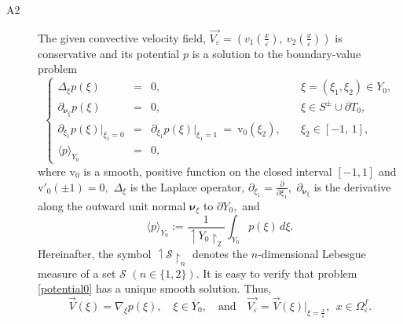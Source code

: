 \documentclass[reqno]{amsart}            %
\numberwithin{equation}{section}
\begin{document}
	
	\begin{description}
		\item[A2] The given convective velocity field, $\overrightarrow{V_\varepsilon} = \left(v_1(\frac{{x}}{\varepsilon}), \  v_2(\tfrac{{x}}{\varepsilon})
		\right)$
		is conservative  and
		its potential $p$ is a solution to the boundary-value problem
		\begin{equation}\label{potential0}
			\left\{\begin{array}{rcll}
				\Delta_\xi p(\xi)  & = & 0, & \quad
				\xi= (\xi_1, \xi_2) \in Y_0,
				\\[3pt]
				\partial_{\boldsymbol{\nu}_\xi} p(\xi)  &=&  0, & \quad
				\xi \in S^\pm \cup  \partial T_0,
				\\[4pt]
				\partial_{\xi_1} p(\xi)\big|_{\xi_1=0}   &=& \partial_{\xi_1} p(\xi)\big|_{\xi_1=1} \  = \ \mathrm{v}_0(\xi_2), & \quad
				\xi_2  \in [-1, \, 1],
				\\[4pt]
				\langle p \rangle_{Y_0} &=& 0, &
			\end{array}\right.
		\end{equation}
		where $\mathrm{v}_0$ is a smooth,  positive function on the closed interval $ [-1, 1]$ and $\mathrm{v}'_0(\pm 1) = 0,$
		$\Delta_\xi$ is  the Laplace operator, $\partial_{\xi_1} = \frac{\partial}{\partial \xi_1},$   $\partial_{\boldsymbol{\nu}_\xi}$ is the derivative along the  outward unit normal $\boldsymbol{\nu}_\xi$ to $\partial Y_0,$ and
		$$
		\langle p \rangle_{Y_0} := \frac{1}{\upharpoonleft\!\! Y_0 \!\!\upharpoonright_2} \int_{Y_0} p(\xi)\, d\xi.
		$$
		Hereinafter, the symbol $\upharpoonleft\!\! \mathcal{S} \!\!\upharpoonright_n$ denotes  the $n$-dimensional Lebesgue measure of a set $\mathcal{S}$ $(n\in \{1, 2\}).$
		It is easy to verify that  problem \eqref{potential0} has a unique smooth solution. Thus,
		$$
		\overrightarrow{V}(\xi) = \nabla_\xi p(\xi), \quad \xi \in \overline{Y}_0, \quad \text{and} \quad
		\overrightarrow{V_\varepsilon} = \overrightarrow{V}(\xi)\big|_{\xi=\frac{x}{\varepsilon}}, \ \ x \in \Omega^f_\varepsilon.
		$$
	\end{description}
\end{document}
